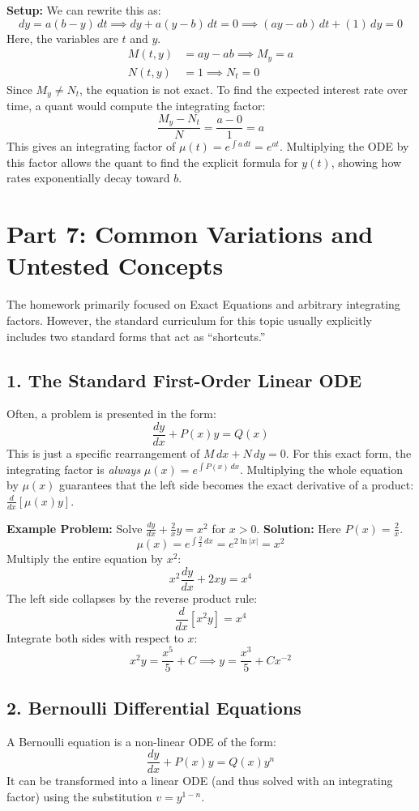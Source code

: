 \documentclass[11pt]{article}
\begin{document}
\textbf{Setup:} We can rewrite this as:
\[ dy = a(b - y) \, dt \implies dy + a(y - b) \, dt = 0 \implies (ay - ab) \, dt + (1) \, dy = 0 \]
Here, the variables are $t$ and $y$.
\begin{align*}
    M(t, y) &= ay - ab \implies M_y = a \\
    N(t, y) &= 1 \implies N_t = 0
\end{align*}
Since $M_y \neq N_t$, the equation is not exact. To find the expected interest rate over time, a quant would compute the integrating factor:
\[ \frac{M_y - N_t}{N} = \frac{a - 0}{1} = a \]
This gives an integrating factor of $\mu(t) = e^{\int a \, dt} = e^{at}$. Multiplying the ODE by this factor allows the quant to find the explicit formula for $y(t)$, showing how rates exponentially decay toward $b$.

\newpage
\section*{Part 7: Common Variations and Untested Concepts}

The homework primarily focused on Exact Equations and arbitrary integrating factors. However, the standard curriculum for this topic usually explicitly includes two standard forms that act as ``shortcuts.''

\subsection*{1. The Standard First-Order Linear ODE}
Often, a problem is presented in the form:
\[ \frac{dy}{dx} + P(x)y = Q(x) \]
This is just a specific rearrangement of $M \, dx + N \, dy = 0$. For this exact form, the integrating factor is \textit{always} $\mu(x) = e^{\int P(x) \, dx}$. Multiplying the whole equation by $\mu(x)$ guarantees that the left side becomes the exact derivative of a product: $\frac{d}{dx}[\mu(x)y]$.

\textbf{Example Problem:} Solve $\frac{dy}{dx} + \frac{2}{x}y = x^2$ for $x > 0$.
\textbf{Solution:} Here $P(x) = \frac{2}{x}$.
\[ \mu(x) = e^{\int \frac{2}{x} \, dx} = e^{2\ln|x|} = x^2 \]
Multiply the entire equation by $x^2$:
\[ x^2\frac{dy}{dx} + 2xy = x^4 \]
The left side collapses by the reverse product rule:
\[ \frac{d}{dx}[x^2y] = x^4 \]
Integrate both sides with respect to $x$:
\[ x^2y = \frac{x^5}{5} + C \implies y = \frac{x^3}{5} + Cx^{-2} \]

\subsection*{2. Bernoulli Differential Equations}
A Bernoulli equation is a non-linear ODE of the form:
\[ \frac{dy}{dx} + P(x)y = Q(x)y^n \]
It can be transformed into a linear ODE (and thus solved with an integrating factor) using the substitution $v = y^{1-n}$.
\end{document}
